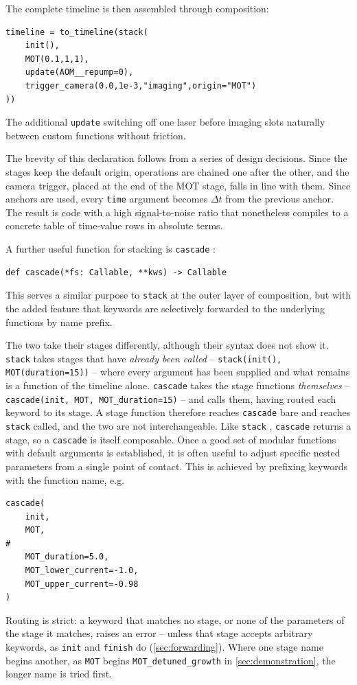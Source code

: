 \documentclass{SciPost}
\newcommand{\python}[1]{%
  \texttt{#1}%
}
\begin{document}
The complete timeline is then assembled through composition:
\begin{verbatim}
timeline = to_timeline(stack(
    init(),
    MOT(0.1,1,1),
    update(AOM__repump=0),
    trigger_camera(0.0,1e-3,"imaging",origin="MOT")
))
\end{verbatim}
%
The additional \python{update} switching off one laser before imaging slots naturally between custom functions without friction.

The brevity of this declaration follows from a series of design decisions. Since the stages keep the default origin, operations are chained one after the other, and the camera trigger, placed at the end of the MOT stage, falls in line with them. Since anchors are used, every \python{time} argument becomes $\Delta t$ from the previous anchor. The result is code with a high signal-to-noise ratio that nonetheless compiles to a concrete table of time-value rows in absolute terms.

A further useful function for stacking is \python{cascade}:
%
\begin{verbatim}
def cascade(*fs: Callable, **kws) -> Callable
\end{verbatim}
%
This serves a similar purpose to \python{stack} at the outer layer of composition, but with the added feature that keywords are selectively forwarded to the underlying functions by name prefix.

The two take their stages differently, although their syntax does not show it. \python{stack} takes stages that have \emph{already been called} – \python{stack(init(), MOT(duration=15))} – where every argument has been supplied and what remains is a function of the timeline alone. \python{cascade} takes the stage functions \emph{themselves} – \python{cascade(init, MOT, MOT_duration=15)} – and calls them, having routed each keyword to its stage. A stage function therefore reaches \python{cascade} bare and reaches \python{stack} called, and the two are not interchangeable. Like \python{stack}, \python{cascade} returns a stage, so a \python{cascade} is itself composable. Once a good set of modular functions with default arguments is established, it is often useful to adjust specific nested parameters from a single point of contact. This is achieved by prefixing keywords with the function name, e.g.
%
\begin{verbatim}
cascade(
    init,
    MOT,
#
    MOT_duration=5.0,
    MOT_lower_current=-1.0,
    MOT_upper_current=-0.98
)
\end{verbatim}
%
Routing is strict: a keyword that matches no stage, or none of the parameters of the stage it matches, raises an error – unless that stage accepts arbitrary keywords, as \python{init} and \python{finish} do (\cref{sec:forwarding}). Where one stage name begins another, as \python{MOT} begins \python{MOT_detuned_growth} in \cref{sec:demonstration}, the longer name is tried first.
%
\end{document}
